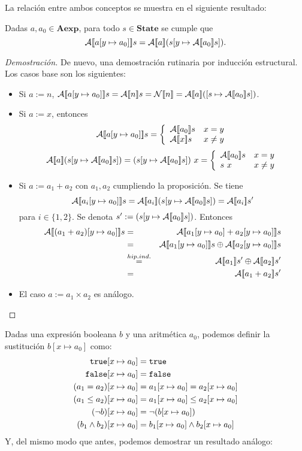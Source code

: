 La relación entre ambos conceptos se muestra en el siguiente resultado:
\begin{lema}
Dadas $a, a_0 \in \mathbf{Aexp}$, para todo $s \in \mathbf{State}$ se cumple que $$\mathcal{A}[\![a[y\mapsto a_0]]\!]s = \mathcal{A}[\![a]\!](s[y\mapsto \mathcal{A}[\![a_0]\!]s]).$$
\end{lema}
\begin{proof}[Demostración]
De nuevo, una demostración rutinaria por inducción estructural. Los casos base son los siguientes:
\begin{itemize}
    \item Si $a := n$, $\fc{A}{a[y\mapsto a_0]}s =  \fc{A}{n}s = \fc{N}{n} = \fc{A}{a}([s\mapsto \fc{A}{a_0}s])$.
    \item Si $a:= x$, entonces
    \[
        \mathcal{A}[\![a[y\mapsto a_0]]\!]s = \left\{\begin{array}{ll}
            \mathcal{A}[\![a_0]\!]s & x=y \\
            \mathcal{A}[\![x]\!]s & x\neq y
        \end{array}\right.
    \]
    $$
        \fc{A}{a}(s[y\mapsto \fc{A}{a_0}s]) = (s[y\mapsto \fc{A}{a_0}s])\ x = \left\{ \begin{array}{ll}
             \fc{A}{a_0}s & x=y \\
             s\ x & x\neq y
        \end{array}\right.
    $$
    \item Si $a := a_1 + a_2$ con $a_1,a_2$ cumpliendo la proposición. Se tiene 
    \[
        \fc{A}{a_i[y\mapsto a_0]}s = \fc{A}{a_i}(s[y\mapsto \fc{A}{a_0}s]) =
        \fc{A}{a_i}s' 
    \]
    para $i\in\{1, 2\}$. Se denota $s' := (s[y\mapsto \mathcal{A}[\![a_0]\!]s])$.
    Entonces
    \begin{eqnarray*}
        \fc{A}{(a_1+a_2)[y\mapsto a_0]}s &=&
        \fc{A}{a_1[y\mapsto a_0]+a_2[y\mapsto a_0]}s  \\
        &=& \fc{A}{a_1[y\mapsto a_0]}s\oplus\fc{A}{a_2[y\mapsto a_0]}s \\
        &\overset{hip.ind.}{=}& \fc{A}{a_1}s' \oplus\fc{A}{a_2}s' \\
        &=& \fc{A}{a_1+a_2}s'
    \end{eqnarray*}
    \item El caso $a := a_1 \times a_2$ es análogo.
\end{itemize}
\end{proof}

Dadas una expresión booleana $b$ y una aritmética $a_0$, podemos definir la sustitución $b[x \mapsto a_0]$ como:
\begin{align*}
    \texttt{true}[x \mapsto a_0] & = \texttt{true} \\
    \texttt{false}[x \mapsto a_0] & = \texttt{false} \\
    (a_1=a_2)[x \mapsto a_0] & = a_1[x \mapsto a_0] = a_2[x \mapsto a_0]\\
    (a_1\leq a_2)[x \mapsto a_0] & = a_1[x \mapsto a_0] \leq a_2[x \mapsto a_0]\\
    (\neg b)[x \mapsto a_0] & = \neg(b[x\mapsto a_0])\\
    (b_1\land b_2)[x \mapsto a_0] & = b_1[x \mapsto a_0] \land b_2[x \mapsto a_0]
\end{align*}
Y, del mismo modo que antes, podemos demostrar un resultado análogo:

